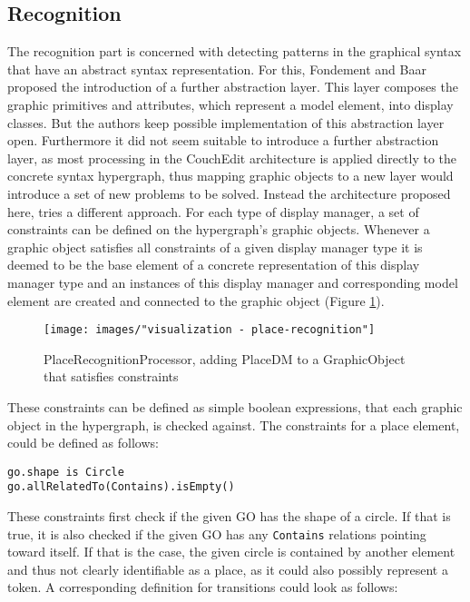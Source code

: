\subsection{Recognition}
\label{sec:recognition}
The recognition part is concerned with detecting patterns in the graphical syntax that have an abstract syntax representation. For this, Fondement and Baar proposed the introduction of a further abstraction layer. This layer composes the graphic primitives and attributes, which represent a model element, into display classes. But the authors keep possible implementation of this abstraction layer open. Furthermore it did not seem suitable to introduce a further abstraction layer, as most processing in the CouchEdit architecture is applied directly to the concrete syntax hypergraph, thus mapping graphic objects to a new layer would introduce a set of new problems to be solved. Instead the architecture proposed here, tries a different approach. For each type of display manager, a set of constraints can be defined on the hypergraph's graphic objects. Whenever a graphic object satisfies all constraints of a given display manager type it is deemed to be the base element of a concrete representation of this display manager type and an instances of this display manager and corresponding model element are created and connected to the graphic object (Figure \ref{fig:place-recognition}). 

\begin{figure}
  \centering
  \texttt{[image: images/"visualization - place-recognition"]}
  \caption{PlaceRecognitionProcessor, adding PlaceDM to a GraphicObject that satisfies constraints}
  \label{fig:place-recognition}
\end{figure}

These constraints can be defined as simple boolean expressions, that each graphic object in the hypergraph, is checked against. The constraints for a place element, could be defined as follows: 

\begin{lstlisting}[language=OCL,caption={Possible constraints to detect GOs representing a place},captionpos=b]
go.shape is Circle
go.allRelatedTo(Contains).isEmpty()
\end{lstlisting} 

These constraints first check if the given GO has the shape of a circle. If that is true, it is also checked if the given GO has any \texttt{Contains} relations pointing toward itself. If that is the case, the given circle is contained by another element and thus not clearly identifiable as a place, as it could also possibly represent a token. A corresponding definition for transitions could look as follows: 

